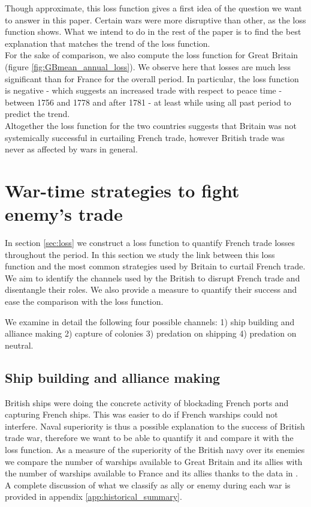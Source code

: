 \documentclass[12pt,a4paper,notitlepage,english]{article}
\begin{document}
Though approximate, this loss function gives a first idea of the question we want to answer in this paper. Certain wars were more disruptive than other, as the loss function shows. What we intend to do in the rest of the paper is to find the best explanation that matches the trend of the loss function. \\ 
For the sake of comparison, we also compute the loss function for Great Britain (figure \ref{fig:GBmean_annual_loss}). We observe here that losses are much less significant than for France for the overall period. In particular, the loss function is negative - which suggests an increased trade with respect to peace time - between 1756 and 1778 and after 1781 - at least while using all past period to predict the trend. \\
Altogether the loss function for the two countries suggests that Britain was not systemically successful in curtailing French trade, however British trade was never as affected by wars in general.  

\section{War-time strategies to fight enemy's trade}
\label{sec:wartime_strategies}
In section \ref{sec:loss} we construct a loss function to quantify French trade losses throughout the period.
In this section we study the link between this loss function and the most common strategies used by Britain to curtail French trade.
We aim to identify the channels used by the British to disrupt French trade and disentangle their roles.
We also provide a measure to quantify their success and ease the comparison with the loss function.  

We examine in detail the following four possible channels: 1) ship building and alliance making 2) capture of colonies 3) predation on shipping 4) predation on neutral.  

\subsection{Ship building and alliance making}
British ships were doing the concrete activity of blockading French ports and capturing French ships.
This was easier to do if French warships could not interfere.
Naval superiority is thus a possible explanation to the success of British trade war, therefore we want to be able to quantify it and compare it with the loss function.
As a measure of the superiority of the British navy over its enemies we compare the number of warships available to Great Britain and its allies with the number of warships available to France and its allies thanks to the data in \cite{Modelski1988}.
A complete discussion of what we classify as ally or enemy during each war is provided in appendix \ref{app:historical_summary}.
 
\end{document}
